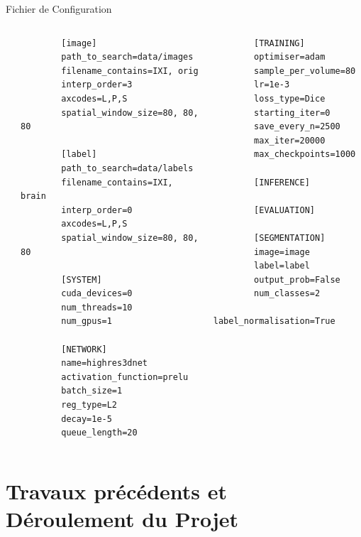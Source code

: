 \documentclass{beamer}
\begin{document}
\begin{frame}[fragile]{Fichier de Configuration}
  \tiny
  \begin{columns}
    \begin{column}{0.01\textwidth}

    \end{column}
    \begin{column}{0.5\textwidth}
      \begin{verbatim}
        [image]
        path_to_search=data/images
        filename_contains=IXI, orig
        interp_order=3
        axcodes=L,P,S
        spatial_window_size=80, 80, 80

        [label]
        path_to_search=data/labels
        filename_contains=IXI, brain
        interp_order=0
        axcodes=L,P,S
        spatial_window_size=80, 80, 80

        [SYSTEM]
        cuda_devices=0
        num_threads=10
        num_gpus=1

        [NETWORK]
        name=highres3dnet
        activation_function=prelu
        batch_size=1
        reg_type=L2
        decay=1e-5
        queue_length=20
      \end{verbatim}
    \end{column}
    \begin{column}{0.5\textwidth}
      \begin{verbatim}
        [TRAINING]
        optimiser=adam
        sample_per_volume=80
        lr=1e-3
        loss_type=Dice
        starting_iter=0
        save_every_n=2500
        max_iter=20000
        max_checkpoints=1000

        [INFERENCE]

        [EVALUATION]

        [SEGMENTATION]
        image=image
        label=label
        output_prob=False
        num_classes=2
        label_normalisation=True
      \end{verbatim}
    \end{column}
  \end{columns}
\end{frame}

\section[Travaux précédents -- Déroulement]{Travaux précédents et Déroulement du Projet}

\subsection*{}
\end{document}
